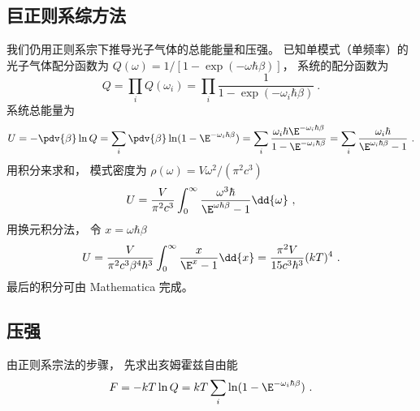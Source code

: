 \subsection{巨正则系综方法}
我们仍用正则系宗下推导光子气体的总能能量和压强。 已知单模式（单频率）的光子气体配分函数为 $Q(\omega) = 1/[1-\exp(-\omega\hbar\beta)]$， 系统的配分函数为
\begin{equation}
Q = \prod_i Q(\omega_i) = \prod_i \frac{1}{1-\exp(-\omega_i\hbar\beta)}~.
\end{equation}
系统总能量为
\begin{equation}
U = -\pdv{\beta} \ln Q = \sum_i \pdv{\beta} \ln(1 - \E^{-\omega_i \hbar \beta}) = \sum_i \frac{\omega_i \hbar \E^{-\omega_i \hbar\beta}}{1-\E^{-\omega_i \hbar \beta}} = \sum_i \frac{\omega_i \hbar}{\E^{\omega_i\hbar\beta} - 1}~.
\end{equation}
用积分来求和， 模式密度为 $\rho(\omega) = V\omega^2/(\pi^2 c^3)$
\begin{equation}
U = \frac{V}{\pi^2 c^3} \int_0^\infty \frac{\omega^3 \hbar}{\E^{\omega\hbar\beta} - 1}\dd{\omega}~,
\end{equation}
用换元积分法， 令 $x = \omega\hbar\beta$
\begin{equation}
U = \frac{V}{\pi^2c^3 \beta^4 \hbar^3} \int_0^\infty \frac{x}{\E^x - 1}\dd{x} = \frac{\pi^2 V}{15c^3 \hbar^3} (kT)^4~.
\end{equation}
最后的积分可由 Mathematica 完成。

\subsection{压强}
由正则系宗法的步骤， 先求出亥姆霍兹自由能
\begin{equation}
F = -kT \ln Q = kT \sum_i \ln(1 - \E^{-\omega_i \hbar\beta})~.
\end{equation}
